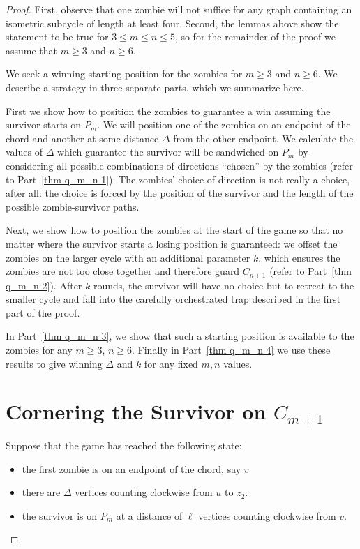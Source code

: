 \begin{proof}
  First, observe that one zombie will not suffice for any graph containing an isometric subcycle of length at least four.
  Second, the lemmas above show the statement to be true for $3\leq m \leq n \leq 5$, so for the remainder of the proof we assume that $m \geq 3$ and $n \geq 6$.

  We seek a winning starting position for the zombies for $m \geq 3$ and $n \geq 6$.
  We describe a strategy in three separate parts, which we summarize here.

  First we show how to position the zombies to guarantee a win assuming the survivor starts on $P_m$.
  We will position one of the zombies on an endpoint of the chord and another at some distance  $\Delta$ from the other endpoint. We calculate the values of $\Delta$ which guarantee the survivor will be sandwiched on $P_m$ by considering all possible combinations of directions ``chosen'' by the zombies (refer to Part~\ref{thm q_m_n 1}). The zombies' choice of direction is not really a choice, after all: the choice is forced by the position of the survivor and the length of the possible zombie-survivor paths.

  Next, we show how to position the zombies at the start of the game so that
  no matter where the survivor starts a losing position is guaranteed:
  we offset the zombies on the larger cycle with an additional parameter $k$, which ensures the zombies are not too close together and therefore guard $C_{n+1}$ (refer to Part~\ref{thm q_m_n 2}). After $k$ rounds, the survivor will have no choice but to retreat to the smaller cycle and fall into the carefully   orchestrated trap described in the first part of the proof.

  In Part~\ref{thm q_m_n 3}, we show that such a starting position is available to the zombies
  for any $m \geq 3$, $n \geq 6$. Finally in Part~\ref{thm q_m_n 4} we use these results to give winning $\Delta$ and $k$ for any fixed $m,n$ values.

  \section{Cornering the Survivor on $C_{m+1}$\label{thm q_m_n 1}}
\begin{proofpart}
   Suppose that the game has reached the following state:

  \begin{itemize}
   \item the first zombie is on an endpoint of the chord, say $v$
   \item there are $\Delta$ vertices counting clockwise from $u$ to $z_2$.
   \item the survivor is on $P_m$ at a distance of $\ell$ vertices counting
   clockwise from $v$.
  \end{itemize}


\end{proofpart}
\end{proof}
